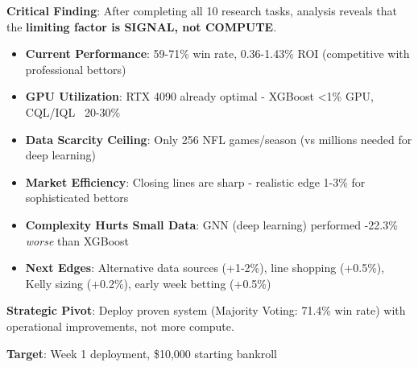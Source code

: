
\textbf{Critical Finding}: After completing all 10 research tasks, analysis reveals that the \textbf{limiting factor is SIGNAL, not COMPUTE}.

\begin{itemize}
  \item \textbf{Current Performance}: 59-71\% win rate, 0.36-1.43\% ROI (competitive with professional bettors)
  \item \textbf{GPU Utilization}: RTX 4090 already optimal - XGBoost <1\% GPU, CQL/IQL ~20-30\%
  \item \textbf{Data Scarcity Ceiling}: Only 256 NFL games/season (vs millions needed for deep learning)
  \item \textbf{Market Efficiency}: Closing lines are sharp - realistic edge 1-3\% for sophisticated bettors
  \item \textbf{Complexity Hurts Small Data}: GNN (deep learning) performed -22.3\% \textit{worse} than XGBoost
  \item \textbf{Next Edges}: Alternative data sources (+1-2\%), line shopping (+0.5\%), Kelly sizing (+0.2\%), early week betting (+0.5\%)
\end{itemize}

\textbf{Strategic Pivot}: Deploy proven system (Majority Voting: 71.4\% win rate) with operational improvements, not more compute.

\textbf{Target}: Week 1 deployment, \$10,000 starting bankroll

